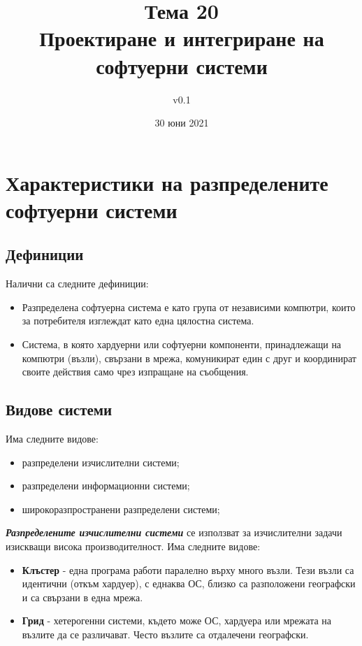 \documentclass[fleqn,12pt]{article}
\title{Тема 20 \\Проектиране и интегриране на софтуерни системи}
\author{v0.1}
\date{30 юни 2021}
\begin{document}
\maketitle
\tableofcontents
\pagebreak

\section{Характеристики на разпределените софтуерни системи}
\subsection{Дефиниции}

Налични са следните дефиниции:
\begin{itemize}
    \item Разпределена софтуерна система е като група от независими компютри, които за потребителя изглеждат като една цялостна система.
    \item Система, в която хардуерни или софтуерни компоненти, принадлежащи на компютри (възли), свързани в мрежа, комуникират един с друг и координират своите действия само чрез изпращане на съобщения.
\end{itemize}

\subsection{Видове системи}

Има следните видове:
\begin{itemize}
    \item разпределени изчислителни системи;
    \item разпределени информационни системи;
    \item широкоразпространени разпределени системи;
\end{itemize}

\textbf{\textit{Разпределените изчислителни системи}} се използват за изчислителни задачи изискващи висока производителност.
Има следните видове:
\begin{itemize}
    \item \textbf{Клъстер} - една програма работи паралелно върху много възли.
    Тези възли са идентични (откъм хардуер), с еднаква ОС, близко са разположени географски и са свързани в една мрежа.
    \item \textbf{Грид} - хетерогенни системи, където може ОС, хардуера или мрежата на възлите да се различават.
    Често възлите са отдалечени географски.
\end{itemize}
\end{document}
